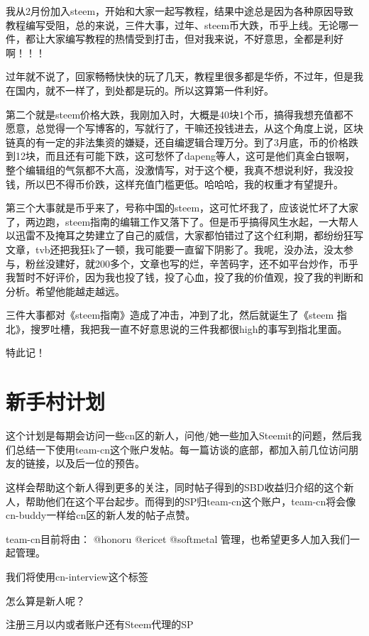 \documentclass[]{ctexbook}
\begin{document}
我从2月份加入steem，开始和大家一起写教程，结果中途总是因为各种原因导致教程编写受阻，总的来说，三件大事，过年、steem币大跌，币乎上线。无论哪一件，都让大家编写教程的热情受到打击，但对我来说，不好意思，全都是利好啊！！！

过年就不说了，回家畅畅快快的玩了几天，教程里很多都是华侨，不过年，但是我在国内，就不一样了，到处都是玩的。所以这算第一件利好。

第二个就是steem价格大跌，我刚加入时，大概是40块1个币，搞得我想充值都不愿意，总觉得一个写博客的，写就行了，干嘛还投钱进去，从这个角度上说，区块链真的有一定的非法集资的嫌疑，还自编逻辑合理万分。到了3月底，币的价格跌到12块，而且还有可能下跌，这可愁怀了dapeng等人，这可是他们真金白银啊，整个编辑组的气氛都不大高，没激情写，对于这个梗，我真不想说利好，我没投钱，所以巴不得币价跌，这样充值门槛更低。哈哈哈，我的权重才有望提升。

第三个大事就是币乎来了，号称中国的steem，这可忙坏我了，应该说忙坏了大家了，两边跑，steem指南的编辑工作又落下了。但是币乎搞得风生水起，一大帮人以迅雷不及掩耳之势建立了自己的威信，大家都怕错过了这个红利期，都纷纷狂写文章，tvb还把我狂k了一顿，我可能要一直留下阴影了。我呢，没办法，没太参与，粉丝没建好，就200多个，文章也写的烂，辛苦码字，还不如平台炒作，币乎我暂时不好评价，因为我也投了钱，投了心血，投了我的价值观，投了我的判断和分析。希望他能越走越远。

三件大事都对《steem指南》造成了冲击，冲到了北，然后就诞生了《steem 指北》，搜罗吐槽，我把我一直不好意思说的三件我都很high的事写到指北里面。

特此记！

\section{新手村计划}

这个计划是每期会访问一些cn区的新人，问他/她一些加入Steemit的问题，然后我们总结一下使用team-cn这个账户发帖。每一篇访谈的底部，都加入前几位访问朋友的链接，以及后一位的预告。

这样会帮助这个新人得到更多的关注，同时帖子得到的SBD收益归介绍的这个新人，帮助他们在这个平台起步。而得到的SP归team-cn这个账户，team-cn将会像cn-buddy一样给cn区的新人发的帖子点赞。

team-cn目前将由： @honoru @ericet @softmetal 管理，也希望更多人加入我们一起管理。

我们将使用cn-interview这个标签

怎么算是新人呢？

注册三月以内或者账户还有Steem代理的SP
\end{document}
